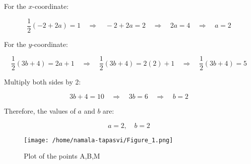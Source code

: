 \documentclass[journal]{IEEEtran}
\begin{document}
For the \( x \)-coordinate:

\[
\frac{1}{2} (-2 + 2a) = 1 \quad \Rightarrow \quad -2 + 2a = 2 \quad \Rightarrow \quad 2a = 4 \quad \Rightarrow \quad a = 2
\]

For the \( y \)-coordinate:

\[
\frac{1}{2} (3b + 4) = 2a + 1 \quad \Rightarrow \quad \frac{1}{2} (3b + 4) = 2(2) + 1 \quad \Rightarrow \quad \frac{1}{2} (3b + 4) = 5
\]

Multiply both sides by 2:

\[
3b + 4 = 10 \quad \Rightarrow \quad 3b = 6 \quad \Rightarrow \quad b = 2
\]


Therefore, the values of \( a \) and \( b \) are:

\[
a = 2, \quad b = 2
\]
\begin{figure}[h!]
   \centering
	\texttt{[image: /home/namala-tapasvi/Figure\_1.png]}
   \caption{Plot of the points A,B,M}
   \label{stemplot}
\end{figure}
\end{document}
